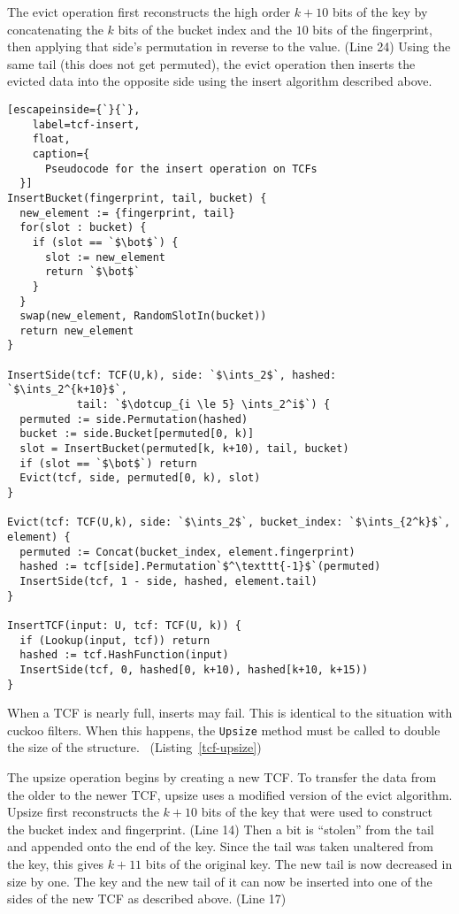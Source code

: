 \documentclass[sigconf, nonacm]{acmart}
\newcommand{\ints}{\mathbb{Z}}
\newcommand{\dotcup}{\ensuremath{\mathaccent\cdot\cup}}
\begin{document}
The evict operation first reconstructs the high order $k + 10$ bits of the key by concatenating the $k$ bits of the bucket index and the $10$ bits of the fingerprint, then applying that side's permutation in reverse to the value. (Line 24)
Using the same tail (this does not get permuted), the evict operation then inserts the evicted data into the opposite side using the insert algorithm described above.

\begin{lstlisting}[escapeinside={`}{`},
    label=tcf-insert,
    float,
    caption={
      Pseudocode for the insert operation on TCFs
  }]
InsertBucket(fingerprint, tail, bucket) {
  new_element := {fingerprint, tail}
  for(slot : bucket) {
    if (slot == `$\bot$`) {
      slot := new_element
      return `$\bot$`
    }
  }
  swap(new_element, RandomSlotIn(bucket))
  return new_element
}

InsertSide(tcf: TCF(U,k), side: `$\ints_2$`, hashed: `$\ints_2^{k+10}$`,
           tail: `$\dotcup_{i \le 5} \ints_2^i$`) {
  permuted := side.Permutation(hashed)
  bucket := side.Bucket[permuted[0, k)]
  slot = InsertBucket(permuted[k, k+10), tail, bucket)
  if (slot == `$\bot$`) return
  Evict(tcf, side, permuted[0, k), slot)
}

Evict(tcf: TCF(U,k), side: `$\ints_2$`, bucket_index: `$\ints_{2^k}$`, element) {
  permuted := Concat(bucket_index, element.fingerprint)
  hashed := tcf[side].Permutation`$^\texttt{-1}$`(permuted)
  InsertSide(tcf, 1 - side, hashed, element.tail)
}

InsertTCF(input: U, tcf: TCF(U, k)) {
  if (Lookup(input, tcf)) return
  hashed := tcf.HashFunction(input)
  InsertSide(tcf, 0, hashed[0, k+10), hashed[k+10, k+15))
}
\end{lstlisting}

When a TCF is nearly full, inserts may fail.
This is identical to the situation with cuckoo filters.
When this happens, the \texttt{Upsize} method must be called to double the size of the structure. ~(Listing~\ref{tcf-upsize})

The upsize operation begins by creating a new TCF.
To transfer the data from the older to the newer TCF, upsize uses a modified version of the evict algorithm.
Upsize first reconstructs the $k+10$ bits of the key that were used to construct the bucket index and fingerprint. (Line 14)
Then a bit is ``stolen'' from the tail and appended onto the end of the key.
Since the tail was taken unaltered from the key, this gives $k+11$ bits of the original key.
The new tail is now decreased in size by one.
The key and the new tail of it can now be inserted into one of the sides of the new TCF as described above. (Line 17)
\end{document}

